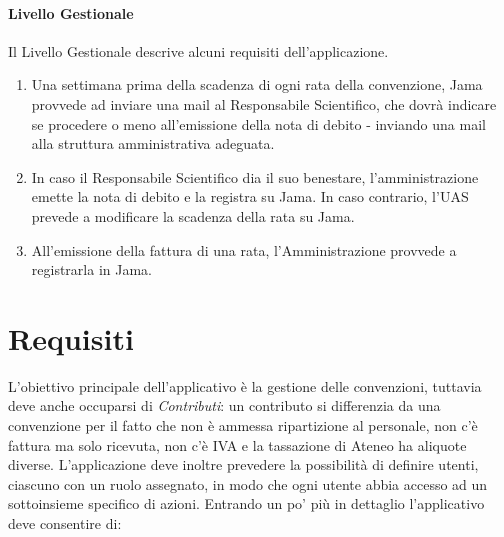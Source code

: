 \paragraph{Livello Gestionale}
Il Livello Gestionale descrive alcuni requisiti dell'applicazione.\newline
\begin{enumerate}
\item Una settimana prima della scadenza di ogni rata della convenzione, Jama provvede ad inviare una mail al Responsabile Scientifico, che dovrà indicare se procedere o meno all'emissione della nota di debito - inviando una mail alla struttura amministrativa adeguata.
\item In caso il Responsabile Scientifico dia il suo benestare, l'amministrazione emette la nota di debito e la registra su Jama. In caso contrario, l'UAS prevede a modificare la scadenza della rata su Jama.
\item All'emissione della fattura di una rata, l'Amministrazione provvede a registrarla in Jama.\newline
\end{enumerate}

\section{Requisiti}
L'obiettivo principale dell'applicativo è la gestione delle convenzioni, tuttavia deve anche occuparsi di \textsl{Contributi}: un contributo si differenzia da una convenzione per il fatto che non è ammessa ripartizione al personale, non c'è fattura ma solo ricevuta, non c'è IVA e la tassazione di Ateneo ha aliquote diverse.\newline
L'applicazione deve inoltre prevedere la possibilità di definire utenti, ciascuno con un ruolo assegnato, in modo che ogni utente abbia accesso ad un sottoinsieme specifico di azioni. Entrando un po' più in dettaglio l'applicativo deve
consentire di:

